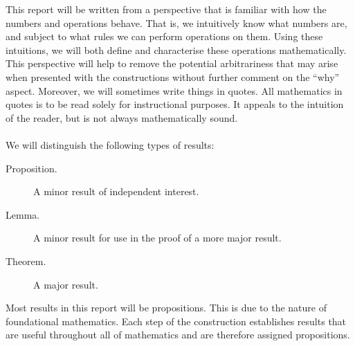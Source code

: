 \documentclass[../main.tex]{subfiles}
\begin{document}
This report will be written from a perspective that is familiar with how the numbers and operations behave. That is, we intuitively know what numbers are, and subject to what rules we can perform operations on them. Using these intuitions, we will both define and characterise these operations mathematically. This perspective will help to remove the potential arbitrariness that may arise when presented with the constructions without further comment on the ``why'' aspect. Moreover, we will sometimes write things in quotes. All mathematics in quotes is to be read solely for instructional purposes. It appeals to the intuition of the reader, but is not always mathematically sound. \\\\
We will distinguish the following types of results:
\begin{description}
    \item[Proposition.] A minor result of independent interest.
    \item[Lemma.] A minor result for use in the proof of a more major result.
    \item[Theorem.] A major result.
\end{description}
Most results in this report will be propositions. This is due to the nature of foundational mathematics. Each step of the construction establishes results that are useful throughout all of mathematics and are therefore assigned propositions.
\end{document}

